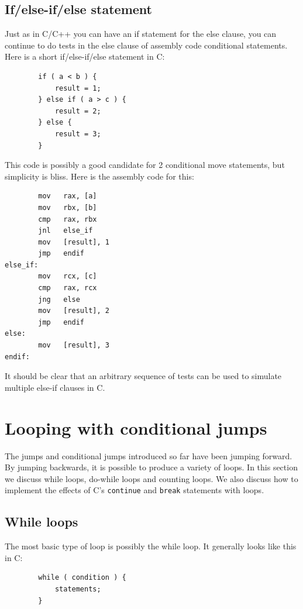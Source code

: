 \documentclass[11pt,b5paper]{book}
\begin{document}
\subsection{If/else-if/else statement}

Just as in C/C++ you can have an if statement for the else clause, you can continue to do tests in the else clause of
assembly code conditional statements.
Here is a short if/else-if/else statement in C:
\begin{verbatim}
        if ( a < b ) {
            result = 1;
        } else if ( a > c ) {
            result = 2;
        } else {
            result = 3;
        }
\end{verbatim}
This code is possibly a good candidate for 2 conditional move statements, but simplicity is bliss.
Here is the assembly code for this:
\begin{verbatim}
        mov   rax, [a]
        mov   rbx, [b]
        cmp   rax, rbx
        jnl   else_if
        mov   [result], 1
        jmp   endif
else_if:
        mov   rcx, [c]
        cmp   rax, rcx
        jng   else
        mov   [result], 2
        jmp   endif
else:
        mov   [result], 3
endif:
\end{verbatim}

It should be clear that an arbitrary sequence of tests can be used to simulate multiple else-if clauses in C.

\section{Looping with conditional jumps}

The jumps and conditional jumps introduced so far have been jumping forward.
By jumping backwards, it is possible to produce a variety of loops.
In this section we discuss while loops, do-while loops and counting loops.
We also discuss how to implement the effects of C's {\tt continue} and {\tt break} statements
with loops.

\subsection{While loops}

The most basic type of loop is possibly the while loop. 
It generally looks like this in C:
\begin{verbatim}
        while ( condition ) {
            statements;
        }
\end{verbatim}
\end{document}
